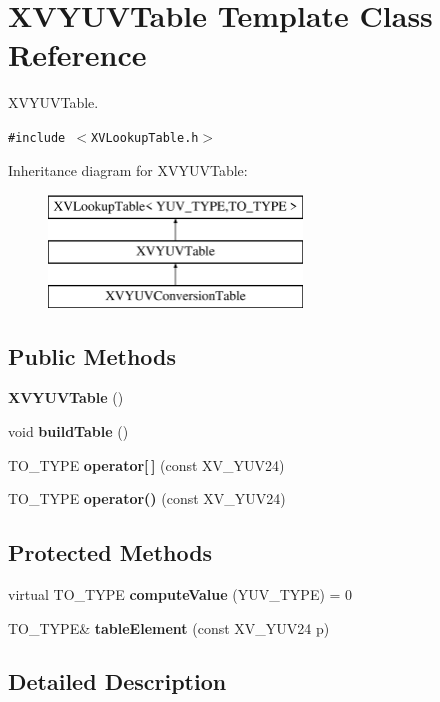 \hypertarget{class_XVYUVTable}{
\section{XVYUVTable  Template Class Reference}
\label{XVYUVTable}
}
XVYUVTable. 


{\tt \#include $<$XVLookup\-Table.h$>$}

Inheritance diagram for XVYUVTable:\begin{figure}[H]
\begin{center}
\leavevmode
\includegraphics[height=3cm]{class_XVYUVTable}
\end{center}
\end{figure}
\subsection*{Public Methods}
\begin{CompactItemize}
\item 
{\bf XVYUVTable} ()
\item 
void {\bf build\-Table} ()
\item 
TO\_\-TYPE {\bf operator\mbox{[}$\,$\mbox{]}} (const XV\_\-YUV24)
\item 
TO\_\-TYPE {\bf operator()} (const XV\_\-YUV24)
\end{CompactItemize}
\subsection*{Protected Methods}
\begin{CompactItemize}
\item 
\label{XVYUVTable_b0}
\hypertarget{class_XVYUVTable_b0}{
virtual TO\_\-TYPE {\bf compute\-Value} (YUV\_\-TYPE) = 0}

\item 
TO\_\-TYPE\& {\bf table\-Element} (const XV\_\-YUV24 p)
\end{CompactItemize}


\subsection{Detailed Description}
